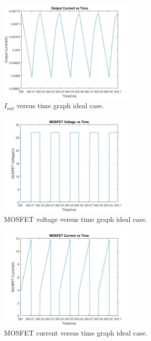 \begin{figure}[H]
    \centering
    \includegraphics[width=0.6\textwidth]{Figures/mat_iout.jpg}
    \caption{$I_{out}$ versus time graph ideal case.}
    \label{fig:mat_i_out}
\end{figure}
\begin{figure}[H]
    \centering
    \includegraphics[width=0.6\textwidth]{Figures/mat_mos_volt.jpg}
    \caption{MOSFET voltage versus time graph ideal case.}
    \label{fig:mat_v_sw}
\end{figure}
\begin{figure}[H]
    \centering
    \includegraphics[width=0.6\textwidth]{Figures/mat_mos_curr.jpg}
    \caption{MOSFET current versus time graph ideal case.}
    \label{fig:mat_i_sw}
\end{figure}

